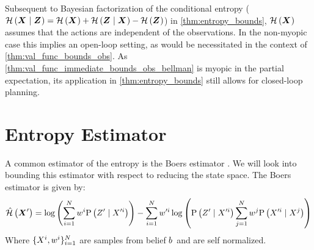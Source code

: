 Subsequent to Bayesian factorization of the conditional entropy ($\mathcal{H}\left({\boldsymbol X_{}}\mid{\ensuremath{\boldsymbol Z_{}}}\right)=\mathcal{H}\left({\boldsymbol X_{}}\right)+\mathcal{H}\left({\boldsymbol Z_{}}\mid{\ensuremath{\boldsymbol X_{}}}\right)-\mathcal{H}\left({\boldsymbol Z_{}}\right)$) in \cref{thm:entropy_bounds}, $\mathcal{H}\left({\boldsymbol X_{}}\right)$ assumes that the actions are independent of the observations. In the non-myopic case this implies an open-loop setting, as would be necessitated in the context of \autoref{thm:val_func_bounds_obs}. As \autoref{thm:val_func_immediate_bounds_obs_bellman} is myopic in the partial expectation, its application in \cref{thm:entropy_bounds} still allows for closed-loop planning.

\section{Entropy Estimator}
A common estimator of the entropy is the Boers estimator \cite{Boers10fusion}. We will look into bounding this estimator with respect to reducing the state space. The Boers estimator is given by:
\begin{equation}
	\label{eq:boers}
		\hat{\mathcal{H}}\left({\boldsymbol X_{}^\prime}\right)=\log\left(\sum_{i=1}^Nw_{}^{i}\mathrm{P}\left({Z_{}^\prime}\mid{\ensuremath{X_{}}^{\prime i}}\right)\right)-\sum_{i=1}^Nw_{}^{\prime i}\log\left(\mathrm{P}\left({Z_{}^\prime }\mid{\ensuremath{X_{}}^{\prime i}}\right)\sum_{j=1}^Nw_{}^{j}\mathrm{P}\left({X_{}^{\prime i}}\mid{\ensuremath{X_{}}^{j}}\right)\right)
\end{equation}
Where $\{X_{}^i,w_{}^{i}\}_{i=1}^N$ are samples from belief $b_{}$ and are self normalized.

